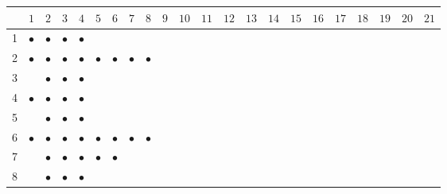 \documentclass[text.tex]{subfiles}
\begin{document}
\begin{table}
\centering
{}
\begin{tabular}{l|ccccccccccccccccccccc}
	\toprule
		& $1$ 	    & $2$       & $3$       & $4$       & $5$       & $6$       & $7$       & $8$       & $9$       & $10$      & $11$      & $12$      & $13$      & $14$      & $15$      & $16$      & $17$      & $18$      & $19$      & $20$      & $21$      \\ 
	\midrule
1	  & $\bullet$	& $\bullet$ & $\bullet$ & $\bullet$	&           &           &           &           &           &           &           &           &           &           &           &           &           &           &           &           &           \\
2   & $\bullet$ & $\bullet$ & $\bullet$ & $\bullet$ & $\bullet$ & $\bullet$ & $\bullet$ & $\bullet$ &           &           &           &           &           &           &           &           &           &           &           &           &           \\
3   &           & $\bullet$ & $\bullet$ & $\bullet$ &           &           &           &           &           &           &           &           &           &           &           &           &           &           &           &           &           \\
4   & $\bullet$ & $\bullet$ & $\bullet$ & $\bullet$ &           &           &           &           &           &           &           &           &           &           &           &           &           &           &           &           &           \\
5   &           & $\bullet$ & $\bullet$ & $\bullet$ &           &           &           &           &           &           &           &           &           &           &           &           &           &           &           &           &           \\
6   & $\bullet$ & $\bullet$ & $\bullet$ & $\bullet$ & $\bullet$ & $\bullet$ & $\bullet$ & $\bullet$ &           &           &           &           &           &           &           &           &           &           &           &           &           \\
7   &           & $\bullet$ & $\bullet$ & $\bullet$ & $\bullet$ & $\bullet$ &           &           &           &           &           &           &           &           &           &           &           &           &           &           &           \\
8   &           & $\bullet$ & $\bullet$ & $\bullet$ &           &           &           &           &           &           &           &           &           &           &           &           &           &           &           &           &           \\

\end{tabular}
\end{table}
\end{document}
